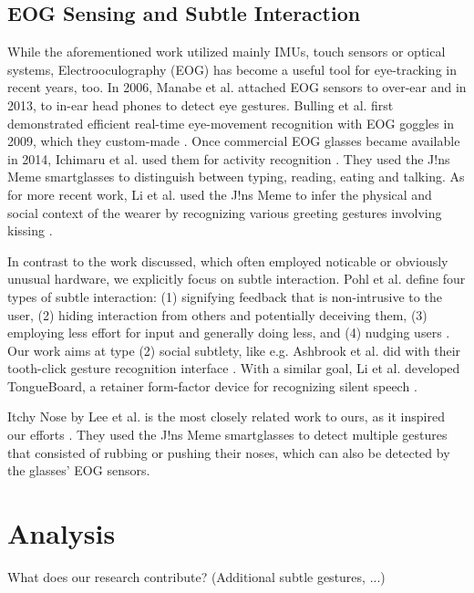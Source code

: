 \documentclass[runningheads]{llncs}
\begin{document}
\subsection{EOG Sensing and Subtle Interaction}
While the aforementioned work utilized mainly IMUs, touch sensors or optical systems,
Electrooculography (EOG) has become a useful tool for eye-tracking in recent years, too. 
In 2006, Manabe et al. attached EOG sensors to over-ear \cite{10.1145/1125451.1125655}
and in 2013, to in-ear head phones \cite{10.1145/2493988.2494329} to detect eye gestures.
Bulling et al. first demonstrated efficient real-time eye-movement recognition
with EOG goggles in 2009, which they custom-made \cite{10.1145/1520340.1520468}.
Once commercial EOG glasses became available in 2014, Ichimaru et al. used them for
activity recognition \cite{10.1145/2638728.2638795}. They used the J!ns Meme
smartglasses to distinguish between typing, reading, eating and talking.
As for more recent work, Li et al. used the J!ns Meme to infer the physical and social
context of the wearer by recognizing various greeting gestures involving kissing
\cite{10.1145/3384657.3384801}.

In contrast to the work discussed, which often employed noticable or obviously unusual
hardware, we explicitly focus on subtle interaction. Pohl et al. define
four types of subtle interaction: (1) signifying feedback that is non-intrusive to the
user, (2) hiding interaction from others and potentially deceiving them, (3) employing
less effort for input and generally doing less, and (4) nudging users
\cite{10.1145/3290605.3300648}. Our work aims at type (2) social subtlety, like e.g.
Ashbrook et al. did with their tooth-click gesture recognition interface
\cite{10.1145/2935334.2935389}. With a similar goal, Li et al. developed TongueBoard,
a retainer form-factor device for recognizing silent speech \cite{10.1145/3311823.3311831}.

Itchy Nose by Lee et al. is the most closely related work to ours,
as it inspired our efforts \cite{10.1145/3123021.3123060}. They used the J!ns Meme
smartglasses to detect multiple gestures that consisted of rubbing or pushing their
noses, which can also be detected by the glasses' EOG sensors.

\section{Analysis}
What does our research contribute? (Additional subtle gestures, ...)
\end{document}
